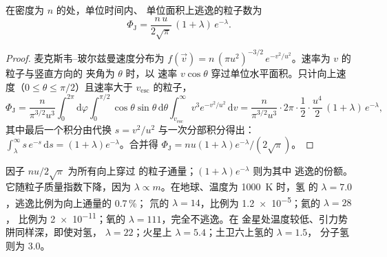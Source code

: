 \begin{theorem}[金斯通量]\label{thm:b3:planetary-atmospheres:jeans}
在密度为 $n$ 的处，单位时间内、
单位面积上逃逸的粒子数为
\[
\Phi_\mathrm J = \frac{n\,u}{2\sqrt\pi}\,(1 + \lambda)\,e^{-\lambda}.
\]
\end{theorem}

\begin{proof}
麦克斯韦–玻尔兹曼速度分布为 $f(\vec v) =
n\,(\pi u^2)^{-3/2}\,e^{-v^2/u^2}$。速率为 $v$ 的粒子与竖直方向的
夹角为 $\theta$ 时，以
速率 $v\cos\theta$ 穿过单位水平面积。只计向上速度（$0 \le \theta \le
\pi/2$）且速率大于 $v_\mathrm{esc}$ 的粒子，
\[
\Phi_\mathrm J = \frac{n}{\pi^{3/2}u^3}\int_0^{2\pi}\!\!\mathrm d\varphi
\int_0^{\pi/2}\!\!\cos\theta\sin\theta\,\mathrm d\theta
\int_{v_\mathrm{esc}}^\infty v^3e^{-v^2/u^2}\,\mathrm dv
= \frac{n}{\pi^{3/2}u^3}\cdot2\pi\cdot\frac12\cdot
\frac{u^4}2\,(1 + \lambda)\,e^{-\lambda},
\]
其中最后一个积分由代换 $s = v^2/u^2$ 与一次分部积分得出：
$\int_\lambda^\infty s\,e^{-s}\,\mathrm ds =
(1 + \lambda)e^{-\lambda}$。合并得 $\Phi_\mathrm J = n u (1 +
\lambda) e^{-\lambda}/(2\sqrt\pi)$。
\end{proof}

因子 $n u/2\sqrt\pi$ 为所有向上穿过
的粒子通量；$(1 + \lambda)e^{-\lambda}$ 则为其中
逃逸的份额。它随粒子质量指数下降，因为
$\lambda \propto m$。在地球、温度为 \qty{1000}{K} 时，氢
的 $\lambda = 7.0$，逃逸比例为向上通量的 0.7\,\%；
氘的 $\lambda = 14$，比例为 \num{1.2e-5}；氦的 $\lambda = 28$，
比例为 \num{2e-11}；氧的 $\lambda = 111$，完全不逃逸。在
金星处温度较低、引力势阱同样深，即使对氢，
$\lambda = 22$；火星上 $\lambda = 5.4$；土卫六上氢的 $\lambda = 1.5$，
分子氢则为 3.0。

